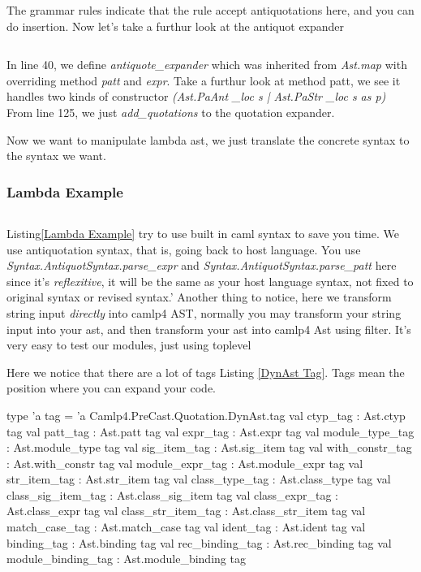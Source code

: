 The grammar rules indicate that the rule accept antiquotations here,
and you can do insertion.  Now let's take a furthur look at the
antiquot expander

\inputminted[fontsize=\scriptsize,linenos=true,stepnumber=5]
{ocaml}{code/camlp4/antiquot_expander/antiquot_expander.ml}

In line 40, we define \textit{antiquote\_expander} which was inherited
from \textit{Ast.map} with overriding method \textit{patt} and
\textit{expr}. Take a furthur look at method patt, we see it handles
two kinds of constructor \textit{(Ast.PaAnt \_loc s | Ast.PaStr \_loc
  s as p)} From line 125, we just \textit{add\_quotations} to the
quotation expander.

Now we want to manipulate lambda ast, we just translate the concrete
syntax to the syntax we want.

\subsubsection{Lambda Example}

\inputminted[fontsize=\scriptsize,linenos=true,stepnumber=5]
{ocaml}{code/camlp4/lambda/lambda.ml}

Listing\ref{Lambda Example} try to use built in caml syntax to save
you time.  We use antiquotation syntax, that is, going back to host
language.  You use \textit{Syntax.AntiquotSyntax.parse\_expr} and
\textit{Syntax.AntiquotSyntax.parse\_patt} here since it's
\textit{reflexitive}, it will be the same as your host language
syntax, not fixed to original syntax or revised syntax.'  Another
thing to notice, here we transform string input \textit{directly} into
camlp4 AST, normally you may transform your string input into your
ast, and then transform your ast into camlp4 Ast using filter.  It's
very easy to test our modules, just using toplevel


Here we notice that there are a lot of tags Listing \ref{DynAst
  Tag}. Tags mean the position where you can expand your code.

\begin{ocamlcode}
    type 'a tag = 'a Camlp4.PreCast.Quotation.DynAst.tag
    val ctyp_tag : Ast.ctyp tag
    val patt_tag : Ast.patt tag
    val expr_tag : Ast.expr tag
    val module_type_tag : Ast.module_type tag
    val sig_item_tag : Ast.sig_item tag
    val with_constr_tag : Ast.with_constr tag
    val module_expr_tag : Ast.module_expr tag
    val str_item_tag : Ast.str_item tag
    val class_type_tag : Ast.class_type tag
    val class_sig_item_tag : Ast.class_sig_item tag
    val class_expr_tag : Ast.class_expr tag
    val class_str_item_tag : Ast.class_str_item tag
    val match_case_tag : Ast.match_case tag
    val ident_tag : Ast.ident tag
    val binding_tag : Ast.binding tag
    val rec_binding_tag : Ast.rec_binding tag
    val module_binding_tag : Ast.module_binding tag
\end{ocamlcode}




